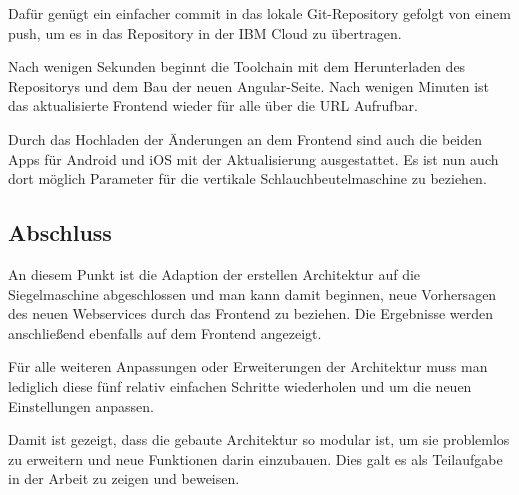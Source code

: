 Dafür genügt ein einfacher commit in das lokale Git-Repository gefolgt von einem push, um es in das Repository in der
IBM Cloud zu übertragen.

Nach wenigen Sekunden beginnt die Toolchain mit dem Herunterladen des Repositorys und dem Bau der neuen Angular-Seite.
Nach wenigen Minuten ist das aktualisierte Frontend wieder für alle über die URL Aufrufbar.

Durch das Hochladen der Änderungen an dem Frontend sind auch die beiden Apps für Android und iOS mit der Aktualisierung
ausgestattet. Es ist nun auch dort möglich Parameter für die vertikale Schlauchbeutelmaschine zu beziehen.

\subsection{Abschluss}
An diesem Punkt ist die Adaption der erstellen Architektur auf die Siegelmaschine abgeschlossen und man kann damit
beginnen, neue Vorhersagen des neuen Webservices durch das Frontend zu beziehen. Die Ergebnisse werden anschließend
ebenfalls auf dem Frontend angezeigt.

Für alle weiteren Anpassungen oder Erweiterungen der Architektur muss man lediglich diese fünf relativ einfachen
Schritte wiederholen und um die neuen Einstellungen anpassen.

Damit ist gezeigt, dass die gebaute Architektur so modular ist, um sie problemlos zu erweitern und neue Funktionen
darin einzubauen. Dies galt es als Teilaufgabe in der Arbeit zu zeigen und beweisen.